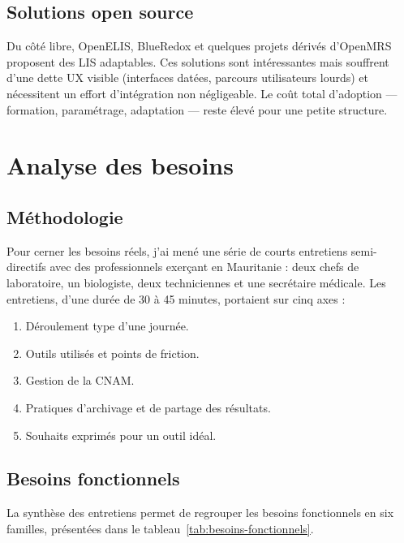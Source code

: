 \documentclass[12pt, a4paper, oneside]{report}
\begin{document}
\subsection{Solutions open source}
Du côté libre, OpenELIS, BlueRedox et quelques projets dérivés
d'OpenMRS proposent des LIS adaptables. Ces solutions sont
intéressantes mais souffrent d'une dette UX visible (interfaces datées,
parcours utilisateurs lourds) et nécessitent un effort d'intégration
non négligeable. Le coût total d'adoption — formation, paramétrage,
adaptation — reste élevé pour une petite structure.

\section{Analyse des besoins}


\subsection{Méthodologie}
Pour cerner les besoins réels, j'ai mené une série de courts entretiens
semi-directifs avec des professionnels exerçant en Mauritanie :
deux chefs de laboratoire, un biologiste, deux techniciennes et une
secrétaire médicale. Les entretiens, d'une durée de 30 à 45 minutes,
portaient sur cinq axes :

\begin{enumerate}
  \item Déroulement type d'une journée.
  \item Outils utilisés et points de friction.
  \item Gestion de la CNAM.
  \item Pratiques d'archivage et de partage des résultats.
  \item Souhaits exprimés pour un outil idéal.
\end{enumerate}

\subsection{Besoins fonctionnels}
La synthèse des entretiens permet de regrouper les besoins fonctionnels
en six familles, présentées dans le tableau~\ref{tab:besoins-fonctionnels}.
\end{document}
